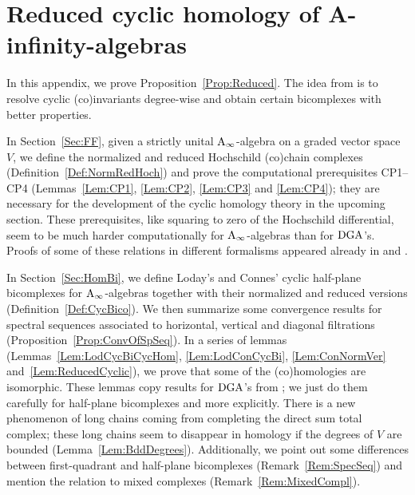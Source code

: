 \documentclass[\MainFolder/Text.tex]{subfiles}
\begin{document}
\chapter{Reduced cyclic homology of A-infinity-algebras}
\label{App:AInfty}
In this appendix, we prove Proposition~\ref{Prop:Reduced}. The idea from \cite{LodayCyclic} is to resolve cyclic (co)invariants degree-wise and obtain certain bicomplexes with better properties.

In Section~\ref{Sec:FF}, given a strictly unital $\mathrm{A}_\infty$-algebra on a graded vector space $V$, we define the normalized and reduced Hochschild (co)chain complexes (Definition~\ref{Def:NormRedHoch}) and prove the computational prerequisites CP1--CP4 (Lemmas~\ref{Lem:CP1}, \ref{Lem:CP2}, \ref{Lem:CP3} and \ref{Lem:CP4}); they are necessary for the development of the cyclic homology theory in the upcoming section. These prerequisites, like squaring to zero of the Hochschild differential, seem to be much harder computationally for $\mathrm{A}_\infty$-algebras than for $\mathrm{DGA}$'s. Proofs of some of these relations in different formalisms appeared already in \cite{Mescher2016} and \cite{Lazarev2003}.

In Section~\ref{Sec:HomBi}, we define Loday's and Connes' cyclic half-plane bicomplexes for $\mathrm{A}_\infty$-algebras together with their normalized and reduced versions (Definition~\ref{Def:CycBico}). We then summarize some convergence results for spectral sequences associated to horizontal, vertical and diagonal filtrations (Proposition~\ref{Prop:ConvOfSpSeq}). In a series of lemmas (Lemmas~\ref{Lem:LodCycBiCycHom}, \ref{Lem:LodConCycBi}, \ref{Lem:ConNormVer} and~\ref{Lem:ReducedCyclic}), we prove that some of the (co)homologies are isomorphic. These lemmas copy results for $\mathrm{DGA}$'s from \cite{LodayCyclic}; we just do them carefully for half-plane bicomplexes and more explicitly. There is a new phenomenon of long chains coming from completing the direct sum total complex; these long chains seem to disappear in homology if the degrees of $V$ are bounded (Lemma~\ref{Lem:BddDegrees}). Additionally, we point out some differences between first-quadrant and half-plane bicomplexes (Remark~\ref{Rem:SpecSeq}) and mention the relation to mixed complexes (Remark~\ref{Rem:MixedCompl}).
\end{document}

